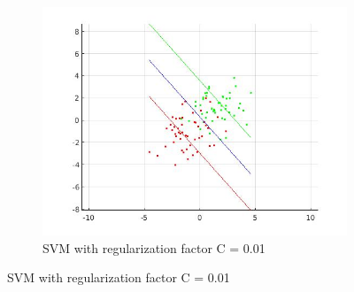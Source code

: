 \documentclass{article} %
\begin{document}
\begin{figure}
\begin{subfigure}{0.33\textwidth}
\includegraphics[scale=0.25]{images/c_p01}
\caption{SVM with regularization factor C = 0.01}
\end{subfigure}


\end{figure}
\end{document}

